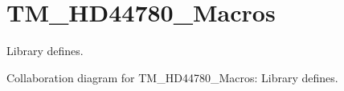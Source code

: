 \hypertarget{group___t_m___h_d44780___macros}{}\section{T\+M\+\_\+\+H\+D44780\+\_\+\+Macros}
\label{group___t_m___h_d44780___macros}


Library defines.  


Collaboration diagram for T\+M\+\_\+\+H\+D44780\+\_\+\+Macros\+:
Library defines. 

